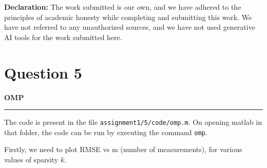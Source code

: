 \documentclass[a4paper,12pt]{article}
\title{\cooltitle{CS754 Assignment-1}}
\author{{\bf Saksham Rathi, Ekansh Ravi Shankar, Kshitij Vaidya}}
\date{}
\newenvironment{solution}[2][]{%
    \begin{mdframed}[linecolor=blue!70!black, linewidth=2pt, roundcorner=10pt, backgroundcolor=yellow!10!white, skipabove=12pt, skipbelow=12pt]%
        \textbf{\large #2}
        \par\noindent\rule{\textwidth}{0.4pt}
}{
    \end{mdframed}
}
\begin{document}
\maketitle

\textbf{Declaration:} The work submitted is our own, and
we have adhered to the principles of academic honesty while completing and submitting this work. We have not referred to any unauthorized sources, and we have not used generative AI tools for the work submitted here.

\section*{Question 5}

\begin{solution}{OMP}
The code is present in the file \texttt{assignment1/5/code/omp.m}. On opening matlab in that folder, the code can be run by executing the command \texttt{omp}.

Firstly, we need to plot RMSE vs m (number of measurements), for various values of sparsity $k$. 


\end{solution}
\end{document}
